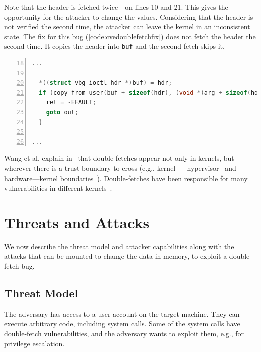 \documentclass[conference]{IEEEtran}
\begin{document}
Note that the header is fetched twice---on lines 10 and 21. This gives the
opportunity for the attacker to change the values. Considering
that the header is not verified the second time, the attacker can
leave the kernel in an inconsistent state. The fix for this bug
(\autoref{code:cvedoublefetchfix}) does not fetch the header the second time. It
copies the header into \texttt{buf} and the second fetch skips it.

\begin{lstlisting}[language=C, caption=CVE-2018-12633 Double Fetch Fix~\cite{cve201812633fix},
  label=code:cvedoublefetchfix,  breaklines=true, captionpos=b,
  postbreak=\mbox{\textcolor{red}{$\hookrightarrow$}\space},
  numbers=left,basicstyle=\scriptsize, firstnumber=18, xleftmargin=5.0ex]
...

  *((struct vbg_ioctl_hdr *)buf) = hdr;
  if (copy_from_user(buf + sizeof(hdr), (void *)arg + sizeof(hdr), hdr.size_in - sizeof(hdr))) {
    ret = -EFAULT;
    goto out;
  }

...

\end{lstlisting}

Wang et al. explain in~\cite{wang2018survey} that double-fetches appear not only
in kernels, but wherever there is a trust boundary to cross (e.g., kernel ---
hypervisor~\cite{wilhelm2016xenpwn} and hardware---kernel
boundaries~\cite{lu2018untrusted}). Double-fetches have been responsible for many
vulnerabilities in different kernels~\cite{jurczyk2013bochspwn, wang2018survey}.


\section{Threats and Attacks}

We now describe the threat model and attacker capabilities along with the
attacks that can be mounted to change the data in memory, to exploit a
double-fetch bug.


\subsection{Threat Model}
\label{sec:threatmodel}

The adversary has access to a user account on the target machine. They can
execute arbitrary code, including system calls. Some of the system calls
have double-fetch vulnerabilities, and the adversary wants to exploit them,
e.g., for privilege escalation.
\end{document}
